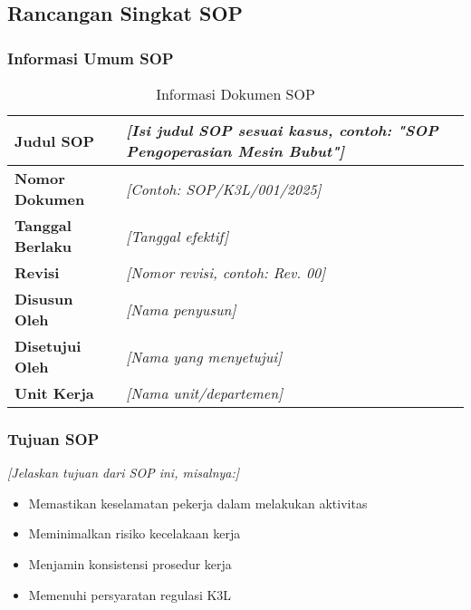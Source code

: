 
\subsection{Rancangan Singkat SOP}
\label{subsec:rancangan-sop}


\subsubsection{Informasi Umum SOP}

\begin{table}[h]
\centering
\begin{tabular}{|p{4cm}|p{9cm}|}
\hline
\textbf{Judul SOP} & \textit{[Isi judul SOP sesuai kasus, contoh: "SOP Pengoperasian Mesin Bubut"]} \\
\hline
\textbf{Nomor Dokumen} & \textit{[Contoh: SOP/K3L/001/2025]} \\
\hline
\textbf{Tanggal Berlaku} & \textit{[Tanggal efektif]} \\
\hline
\textbf{Revisi} & \textit{[Nomor revisi, contoh: Rev. 00]} \\
\hline
\textbf{Disusun Oleh} & \textit{[Nama penyusun]} \\
\hline
\textbf{Disetujui Oleh} & \textit{[Nama yang menyetujui]} \\
\hline
\textbf{Unit Kerja} & \textit{[Nama unit/departemen]} \\
\hline
\end{tabular}
\caption{Informasi Dokumen SOP}
\label{tab:info-sop}
\end{table}

\vspace{0.5cm}

\subsubsection{Tujuan SOP}

\textit{[Jelaskan tujuan dari SOP ini, misalnya:]}
\begin{itemize}
    \item Memastikan keselamatan pekerja dalam melakukan aktivitas
    \item Meminimalkan risiko kecelakaan kerja
    \item Menjamin konsistensi prosedur kerja
    \item Memenuhi persyaratan regulasi K3L
\end{itemize}

